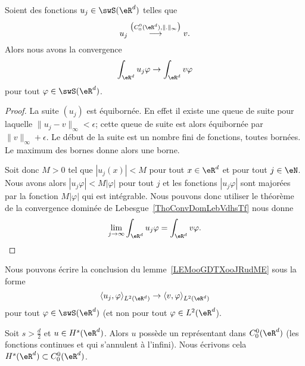 \begin{lemma}       \label{LEMooGDTXooJRudME}
	Soient des fonctions \(u_j\in\swS(\eR^d) \) telles que
	\begin{equation}
		u_j\stackrel{\big( C_0^0(\eR^d),\| . \|_{\infty} \big)}{\longrightarrow}v.
	\end{equation}
	Alors nous avons la convergence
	\begin{equation}
		\int_{\eR^d}u_j\varphi\to\int_{\eR^d}v\varphi
	\end{equation}
	pour tout \( \varphi\in\swS(\eR^d)\).
\end{lemma}

\begin{proof}
	La suite \( (u_j)\) est équibornée. En effet il existe une queue de suite pour laquelle \( \| u_j-v \|_{\infty}<\epsilon\); cette queue de suite est alors équibornée par \( \| v \|_{\infty}+\epsilon\). Le début de la suite est un nombre fini de fonctions, toutes bornées. Le maximum des bornes donne alors une borne.

	Soit donc \( M>0\) tel que \( | u_j(x) |<M\) pour tout \( x\in \eR^d\) et pour tout \( j\in \eN\). Nous avons alors \( | u_j\varphi |<M| \varphi |\) pour tout \( j\) et les fonctions \(  | u_j\varphi | \) sont majorées par la fonction \( M| \varphi |\) qui est intégrable. Nous pouvons donc utiliser le théorème de la convergence dominée de Lebesgue~\ref{ThoConvDomLebVdhsTf} nous donne
	\begin{equation}
		\lim_{j\to \infty} \int_{\eR^d} u_j\varphi=\int_{\eR^d}v\varphi.
	\end{equation}
\end{proof}

Nous pouvons écrire la conclusion du lemme~\ref{LEMooGDTXooJRudME} sous la forme
\begin{equation}
	\langle u_j, \varphi\rangle_{L^2(\eR^d)}\to \langle v, \varphi\rangle_{L^2(\eR^d)}
\end{equation}
pour tout \( \varphi\in \swS(\eR^d)\) (et non pour tout \( \varphi\in L^2(\eR^d\)).

\begin{theorem}[Théorème de Sobolev avec \( k=0\)\cite{ooFZERooPVhoge}]     \label{THOooOHIPooXSEkVI}
	Soit \( s>\frac{ d }{ 2 }\) et \( u\in H^s(\eR^d)\). Alors \( u\) possède un représentant dans \( C^0_0(\eR^d)\) (les fonctions continues et qui s'annulent à l'infini). Nous écrivons cela \( H^s(\eR^d)\subset C_0^0(\eR^d)\).
\end{theorem}

